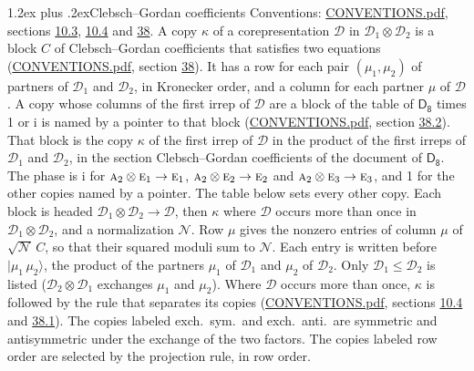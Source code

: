 \documentclass[10pt,a4paper]{article}
\makeatletter
\renewcommand\section{\@startsection{section}{1}{\z@}{-3ex plus -1ex minus -.2ex}%
  {1.2ex plus .2ex}{\normalfont\large\sffamily\bfseries\color{parttitle}}}
\numberwithin{equation}{section}
\newcommand{\grp}[1]{\mathsf{#1}}
\newcommand{\irr}[1]{\text{\normalfont\scshape #1}}
\newcommand{\iunit}{\mathrm{i}}
\newcommand{\irrprod}{\otimes}
\newcommand{\mult}{\kappa}
\newcommand{\intx}{\mu}
\newcommand{\cgnorm}{\mathcal{N}}
\newcommand{\prodket}[2]{\lvert {#1}\,{#2}\rangle}
\makeatother
\begin{document}
\section{Clebsch--Gordan coefficients}\label{s:clebsch_gordan}
Conventions: \href{../../CONVENTIONS.pdf}{CONVENTIONS.pdf}, sections \href{../../../rotation/CONVENTIONS.pdf\#conv.10.3}{10.3}, \href{../../../rotation/CONVENTIONS.pdf\#conv.10.4}{10.4} and \href{../../CONVENTIONS.pdf\#conv.38}{38}.
\leavevmode\label{n:index.copy}\label{n:matrix.cg.stored}A copy $\mult$ of a corepresentation $\mathcal{D}$ in $\mathcal{D}_1\irrprod\mathcal{D}_2$ is a block $C$ of Clebsch--Gordan coefficients that satisfies two equations (\href{../../CONVENTIONS.pdf}{CONVENTIONS.pdf}, section \href{../../CONVENTIONS.pdf\#conv.38}{38}). \label{n:index.cg}It has a row for each pair $(\intx_1, \intx_2)$ of partners of $\mathcal{D}_1$ and $\mathcal{D}_2$, in Kronecker order, and a column for each partner $\intx$ of $\mathcal{D}$.
A copy whose columns of the first irrep of $\mathcal{D}$ are a block of the table of $\grp{D_{8}}$ times 1 or $\iunit$ is named by a pointer to that block (\href{../../CONVENTIONS.pdf}{CONVENTIONS.pdf}, section \href{../../CONVENTIONS.pdf\#conv.38.2}{38.2}). That block is the copy $\mult$ of the first irrep of $\mathcal{D}$ in the product of the first irreps of $\mathcal{D}_1$ and $\mathcal{D}_2$, in the section Clebsch--Gordan coefficients of the document of \href{../../../rotation/data/pdf/D8.pdf}{$\grp{D_{8}}$}. The phase is $\iunit$ for $\irr{a}_{2}\irrprod \irr{e}_{1}\to \irr{e}_{1}$, $\irr{a}_{2}\irrprod \irr{e}_{2}\to \irr{e}_{2}$ and $\irr{a}_{2}\irrprod \irr{e}_{3}\to \irr{e}_{3}$, and 1 for the other copies named by a pointer. The table below sets every other copy.
Each block is headed $\mathcal{D}_1\irrprod\mathcal{D}_2\to\mathcal{D}$, then $\mult$ where $\mathcal{D}$ occurs more than once in $\mathcal{D}_1\irrprod\mathcal{D}_2$, and a normalization $\cgnorm$. Row $\intx$ gives the nonzero entries of column $\intx$ of $\sqrt{\cgnorm}\,C$, so that their squared moduli sum to $\cgnorm$. \label{n:vector.ket.product}Each entry is written before $\prodket{\intx_1}{\intx_2}$, the product of the partners $\intx_1$ of $\mathcal{D}_1$ and $\intx_2$ of $\mathcal{D}_2$. Only $\mathcal{D}_1 \le \mathcal{D}_2$ is listed ($\mathcal{D}_2\irrprod\mathcal{D}_1$ exchanges $\intx_1$ and $\intx_2$).
Where $\mathcal{D}$ occurs more than once, $\mult$ is followed by the rule that separates its copies (\href{../../CONVENTIONS.pdf}{CONVENTIONS.pdf}, sections \href{../../../rotation/CONVENTIONS.pdf\#conv.10.4}{10.4} and \href{../../CONVENTIONS.pdf\#conv.38.1}{38.1}). \label{n:abbreviation.exchange}The copies labeled exch.\ sym.\ and exch.\ anti.\ are symmetric and antisymmetric under the exchange of the two factors. The copies labeled row order are selected by the projection rule, in row order.
\end{document}
